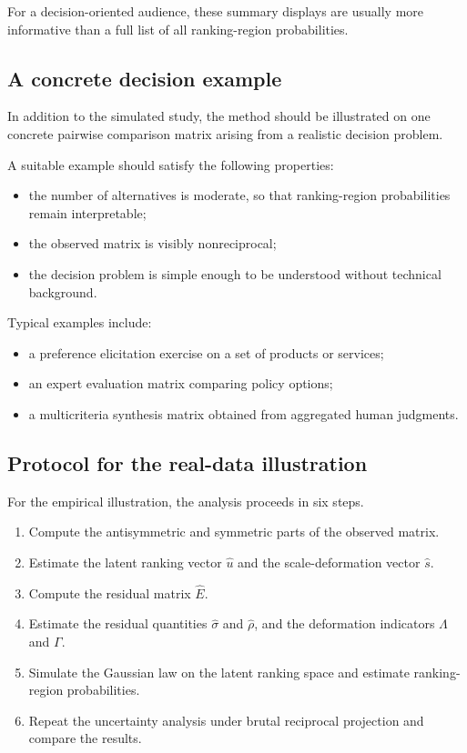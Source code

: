 \documentclass[11pt]{amsart}
\theoremstyle{definition}
\theoremstyle{plain}
\numberwithin{equation}{section}
\begin{document}
For a decision-oriented audience, these summary displays are usually more informative than a full list of all ranking-region probabilities.

\subsection{A concrete decision example}

In addition to the simulated study, the method should be illustrated on one concrete pairwise comparison matrix arising from a realistic decision problem.

A suitable example should satisfy the following properties:
\begin{itemize}
\item the number of alternatives is moderate, so that ranking-region probabilities remain interpretable;
\item the observed matrix is visibly nonreciprocal;
\item the decision problem is simple enough to be understood without technical background.
\end{itemize}

Typical examples include:
\begin{itemize}
\item a preference elicitation exercise on a set of products or services;
\item an expert evaluation matrix comparing policy options;
\item a multicriteria synthesis matrix obtained from aggregated human judgments.
\end{itemize}

\subsection{Protocol for the real-data illustration}

For the empirical illustration, the analysis proceeds in six steps.

\begin{enumerate}[label=\textup{Step \arabic*.}]
\item Compute the antisymmetric and symmetric parts of the observed matrix.
\item Estimate the latent ranking vector $\widehat u$ and the scale-deformation vector $\widehat s$.
\item Compute the residual matrix $\widehat E$.
\item Estimate the residual quantities $\widehat\sigma$ and $\widehat\rho$, and the deformation indicators $\Lambda$ and $\Gamma$.
\item Simulate the Gaussian law on the latent ranking space and estimate ranking-region probabilities.
\item Repeat the uncertainty analysis under brutal reciprocal projection and compare the results.
\end{enumerate}
\end{document}
